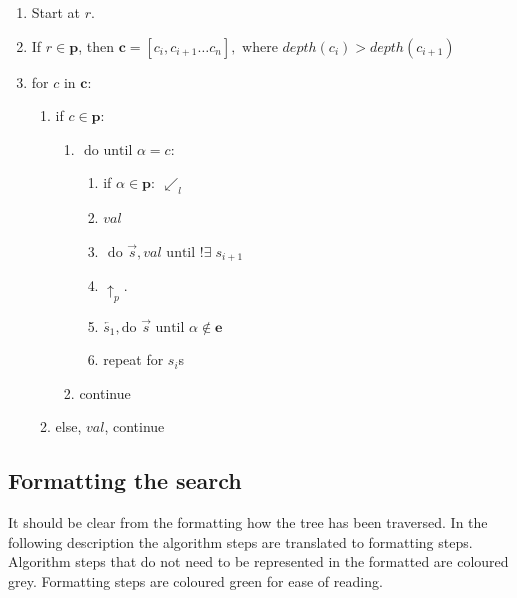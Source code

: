 \documentclass[11pt]{article}
\newcommand{\greycol}{black!20}
\newcommand{\grey}[1]{\textcolor{\greycol}{#1}}
\newcommand{\green}[1]{\textcolor{black!50!green}{#1}}
\begin{document}
\begin{enumerate}
	\item Start at $r$.
	\item If $r \in \mathbf{p}$, then $\mathbf{c} = [c_i, c_{i+1} \dotsc c_n], \text{ where } depth(c_i) > depth(c_{i+1})$
	\item for $c$ in $\mathbf{c}:$
	\begin{enumerate}
			\item if $c \in \mathbf{p}$:
			\begin{enumerate}
				\item $\text{ do until } \alpha = c:$
				\begin{enumerate}
					\item if $\alpha \in \mathbf{p}: \:\swarrow_l$
					\item $val$
					\item  $\text{ do } \overrightarrow{s},val \text{ until } !\exists\; s_{i+1}$
					\item $\uparrow_p$.
					\item $\overleftarrow{s_1}, \text{do } \overrightarrow{s} \text{ until } \alpha \not\in \mathbf{e}$
					\item repeat for $s_i$s
				\end{enumerate}
				\item continue
			\end{enumerate}
			\item else, $val$, continue
	\end{enumerate}
\end{enumerate}

\subsection{Formatting the search}

It should be clear from the formatting how the tree has been traversed. In the following description the algorithm steps are translated to formatting steps. Algorithm steps that do not need to be represented in the formatted are coloured \grey{grey}. Formatting steps are coloured \green{green} for ease of reading.
\end{document}
